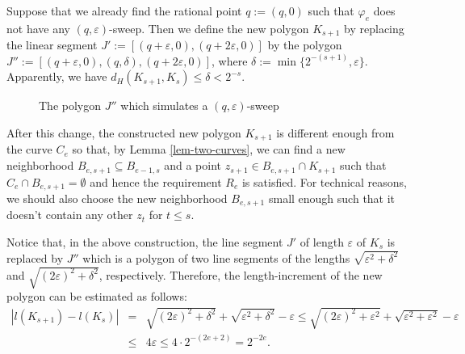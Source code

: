 \documentclass{LMCS}
\theoremstyle{plain}
\begin{document}
Suppose that we already find the rational point $q :=(q, 0)$ such that $\varphi_e$ does not have any $(q,\varepsilon)$-sweep. Then we define the new polygon $K_{s+1}$ by replacing the linear segment $J':=[(q+\varepsilon,0),(q+2\varepsilon, 0)]$ by the polygon  $J'':=[(q+\varepsilon, 0), (q, \delta),(q+2\varepsilon, 0)]$, where $\delta:= \min\{ 2^{-(s+1)}, \varepsilon\}$. Apparently, we have $d_H(K_{s+1}, K_s) \le \delta < 2^{-s}$.

\begin{figure}[h]
\begin{center}
\end{center}
\caption{The polygon $J''$ which simulates a $(q,\varepsilon)$-sweep}\label{fig-K-R}
\end{figure}


After this change, the constructed new polygon $K_{s+1}$ is different enough from the curve $C_e$ so that, by Lemma \ref{lem-two-curves}, we can find a new neighborhood $B_{e,s+1} \subseteq B_{e-1, s}$ and  a point $z_{s+1} \in B_{e,s+1} \cap K_{s+1}$ such that $C_e\cap B_{e,s+1} = \emptyset$ and hence the requirement $R_e$ is satisfied. For technical reasons, we should also choose the new neighborhood $B_{e,s+1}$ small enough such that it doesn't contain any other $z_t$ for $t \le s$.

\noindent Notice that, in the above construction, the line segment $J'$ of length $\varepsilon$ of $K_s$ is replaced by $J''$ which is a polygon of two line segments of the lengths $\sqrt{\varepsilon^2 + \delta^2}$ and $\sqrt{(2\varepsilon)^2 + \delta^2}$, respectively. Therefore, the length-increment of the new polygon can be estimated as follows:
\begin{eqnarray*}
\left| l(K_{s+1}) - l(K_s)\right| &=& \sqrt{(2\varepsilon)^2 + \delta^2}+\sqrt{\varepsilon^2 + \delta^2} -\varepsilon
\le  \sqrt{(2\varepsilon)^2 + \varepsilon^2}+\sqrt{\varepsilon^2 + \varepsilon^2} -\varepsilon \\
&\le& 4\varepsilon \le 4\cdot 2^{-(2e+2)} = 2^{-2e}.
\end{eqnarray*}
\end{document}
